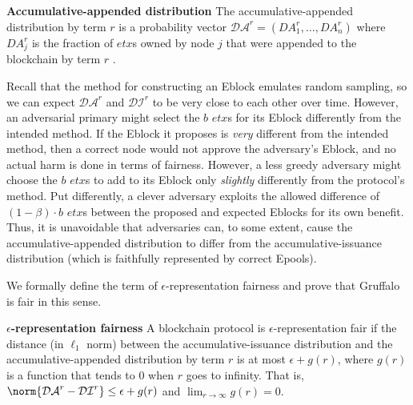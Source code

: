 \begin{definition}{\textbf{Accumulative-appended distribution}} The accumulative-appended distribution by term $r$ is a probability vector $\mathcal{DA}^r=\left(DA^r_1,\dots , DA^r_n \right )$ where $DA_j^r$ is the fraction of $etx$s owned by node $j$ that were appended to the blockchain by term $r$ . 
\end{definition}


Recall that the method for constructing an Eblock emulates random sampling, so we can expect $\mathcal{DA}^r$ and $\mathcal{DI}^r$ to be very close to each other over time. However, an adversarial primary might select the $b$ $etx$s for its Eblock differently from the intended method. If the Eblock it proposes is \emph{very} different from the intended method, then a correct node would not approve the adversary's Eblock, and no actual harm is done in terms of fairness. However, a less greedy adversary might choose the $b$ $etx$s to add to its Eblock only \emph{slightly} differently from the protocol's method. Put differently, a clever adversary exploits the allowed difference of $(1-\beta)\cdot b$ $etx$s between the proposed and expected Eblocks for its own benefit. Thus, it is unavoidable that adversaries can, to some extent, cause the accumulative-appended distribution to differ from the accumulative-issuance distribution (which is faithfully represented by correct Epools). 

We formally define the term of $\epsilon$-representation fairness and prove that Gruffalo is fair in this sense. 

\begin{definition}{\textbf{$\epsilon$-representation fairness}} A blockchain protocol is $\epsilon$-representation fair if the distance (in $\ell _1$ norm) between the accumulative-issuance distribution and the accumulative-appended distribution by term $r$ is at most $\epsilon+g(r)$, where $g(r)$ is a function that tends to $0$ when $r$ goes to infinity. That is,  $\norm{\mathcal{DA}^r-\mathcal{DI}^{r}}\leq \epsilon+g(r)$ and $\lim _{r\rightarrow \infty}g(r)=0$.
\end{definition}
 
